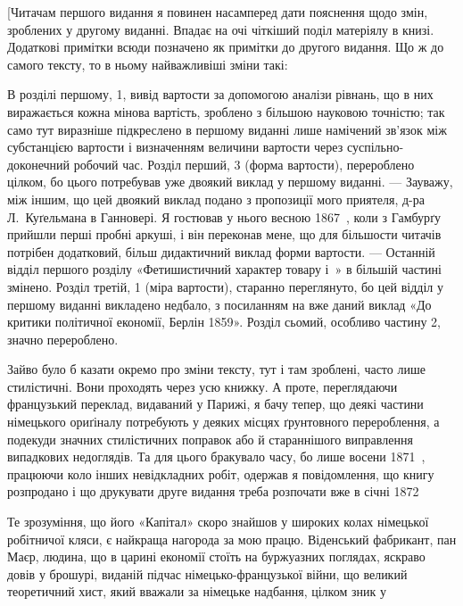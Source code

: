 

\label{original-81}
[Читачам першого видання я повинен насамперед дати пояснення
щодо змін, зроблених у другому виданні. Впадає на очі
чіткіший поділ матеріялу в книзі. Додаткові примітки всюди
позначено як примітки до другого видання. Що ж до самого тексту,
то в ньому найважливіші зміни такі:

В розділі першому, 1, вивід вартости за допомогою аналізи
рівнань, що в них виражається кожна мінова вартість, зроблено
з більшою науковою точністю; так само тут виразніше підкреслено
в першому виданні лише намічений зв’язок між субстанцією
вартости і визначенням величини вартости через суспільно-доконечний
робочий час. Розділ перший, 3 (форма вартости), перероблено
цілком, бо цього потребував уже двоякий виклад у
першому виданні. — Зауважу, між іншим, що цей двоякий виклад
подано з пропозиції мого приятеля, д-ра Л.~Куґельмана в Ганновері.
Я гостював у нього весною 1867~, коли з Гамбурґу
прийшли перші пробні аркуші, і він переконав мене, що для більшости
читачів потрібен додатковий, більш дидактичний виклад
форми вартости. — Останній відділ першого розділу «Фетишистичний
характер товару і~» в більшій частині змінено. Розділ
третій, 1 (міра вартости), старанно переглянуто, бо цей відділ
у першому виданні викладено недбало, з посиланням на вже даний
виклад «До критики політичної економії, Берлін 1859». Розділ
сьомий, особливо частину 2, значно перероблено.

Зайво було б казати окремо про зміни тексту, тут і там зроблені,
часто лише стилістичні. Вони проходять через усю книжку.
А проте, переглядаючи французький переклад, видаваний у Парижі,
я бачу тепер, що деякі частини німецького ориґіналу потребують
у деяких місцях ґрунтовного перероблення, а подекуди
значних стилістичних поправок або й стараннішого виправлення
випадкових недоглядів. Та для цього бракувало часу, бо лише
восени 1871~, працюючи коло інших невідкладних робіт, одержав
я повідомлення, що книгу розпродано і що друкувати друге
видання треба розпочати вже в січні 1872~

Те зрозуміння, що його «Капітал» скоро знайшов у широких
колах німецької робітничої кляси, є найкраща нагорода за мою
працю. Віденський фабрикант, пан Маєр, людина, що в царині
економії стоїть на буржуазних поглядах, яскраво довів у брошурі,
виданій підчас німецько-французької війни, що великий теоретичний
хист, який вважали за німецьке надбання, цілком зник у
\parbreak{}  %
